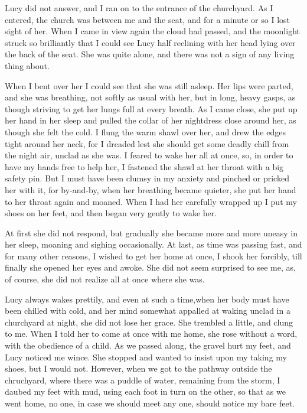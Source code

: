 Lucy did not answer, and I ran on to the entrance of the churchyard. As I entered, the church was between me and the seat, and for a minute or so I lost sight of her. When I came in view again the cloud had passed, and the moonlight struck so brilliantly that I could see Lucy half reclining with her head lying over the back of the seat. She was quite alone, and there was not a sign of any living thing about. 

When I bent over her I could see that she was still asleep. Her lips were parted, and she was breathing, not softly as usual with her, but in long, heavy gasps, as though striving to get her lungs full at every breath. As I came close, she put up her hand in her sleep and pulled the collar of her nightdress close around her, as though she felt the cold. I flung the warm shawl over her, and drew the edges tight around her neck, for I dreaded lest she should get some deadly chill from the night air, unclad as she was. I feared to wake her all at once, so, in order to have my hands free to help her, I fastened the shawl at her throat with a big safety pin. But I must have been clumsy in my anxiety and pinched or pricked her with it, for by-and-by, when her breathing became quieter, she put her hand to her throat again and moaned. When I had her carefully wrapped up I put my shoes on her feet, and then began very gently to wake her. 

At first she did not respond, but gradually she became more and more uneasy in her sleep, moaning and sighing occasionally. At last, as time was passing fast, and for many other reasons, I wished to get her home at once, I shook her forcibly, till finally she opened her eyes and awoke. She did not seem surprised to see me, as, of course, she did not realize all at once where she was. 

Lucy always wakes prettily, and even at such a time,when her body must have been chilled with cold, and her mind somewhat appalled at waking unclad in a churchyard at night, she did not lose her grace. She trembled a little, and clung to me. When I told her to come at once with me home, she rose without a word, with the obedience of a child. As we passed along, the gravel hurt my feet, and Lucy noticed me wince. She stopped and wanted to insist upon my taking my shoes, but I would not. However, when we got to the pathway outside the chruchyard, where there was a puddle of water, remaining from the storm, I daubed my feet with mud, using each foot in turn on the other, so that as we went home, no one, in case we should meet any one, should notice my bare feet. 

